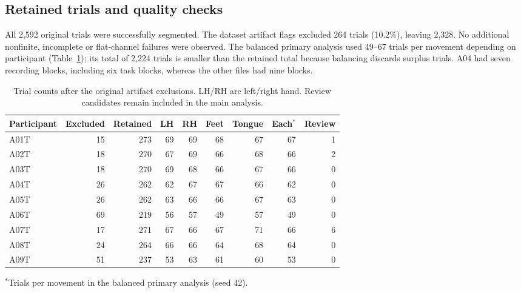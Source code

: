 \subsection{Retained trials and quality checks}

All 2,592 original trials were successfully segmented. The dataset artifact flags excluded 264 trials (10.2\%), leaving 2,328. No additional nonfinite, incomplete or flat-channel failures were observed. The balanced primary analysis used 49--67 trials per movement depending on participant (Table~\ref{tab:trials}); its total of 2,224 trials is smaller than the retained total because balancing discards surplus trials. A04 had seven recording blocks, including six task blocks, whereas the other files had nine blocks.

\begin{table}[htbp]\centering

\caption{Trial counts after the original artifact exclusions. LH/RH are left/right hand. Review candidates remain included in the main analysis.}\label{tab:trials}

\small\begin{tabular}{lrrrrrrrr}\toprule

Participant & Excluded & Retained & LH & RH & Feet & Tongue & Each$^*$ & Review\\\midrule

A01T & 15 & 273 & 69 & 69 & 68 & 67 & 67 & 1 \\

A02T & 18 & 270 & 67 & 69 & 66 & 68 & 66 & 2 \\

A03T & 18 & 270 & 69 & 68 & 66 & 67 & 66 & 0 \\

A04T & 26 & 262 & 62 & 67 & 67 & 66 & 62 & 0 \\

A05T & 26 & 262 & 63 & 66 & 66 & 67 & 63 & 0 \\

A06T & 69 & 219 & 56 & 57 & 49 & 57 & 49 & 0 \\

A07T & 17 & 271 & 67 & 66 & 67 & 71 & 66 & 6 \\

A08T & 24 & 264 & 66 & 66 & 64 & 68 & 64 & 0 \\

A09T & 51 & 237 & 53 & 63 & 61 & 60 & 53 & 0 \\

\bottomrule\end{tabular}

\par\smallskip\footnotesize $^*$Trials per movement in the balanced primary analysis (seed 42).

\end{table}

